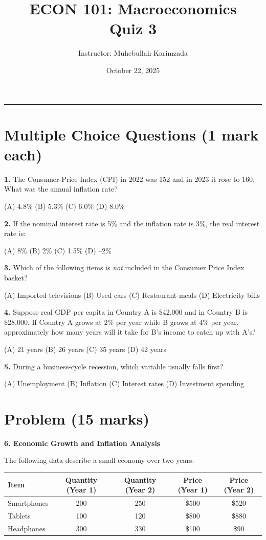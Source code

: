 \documentclass[12pt]{article}
\title{ECON 101: Macroeconomics \\ Quiz 3}
\author{Instructor: Muhebullah Karimzada}
\date{October 22,  2025}
\begin{document}
\maketitle
\hrule
\vspace{1em}

\section*{Multiple Choice Questions (1 mark each)}

\textbf{1.}  
The Consumer Price Index (CPI) in 2022 was 152 and in 2023 it rose to 160.  
What was the annual inflation rate?  

(A) 4.8\% \quad (B) 5.3\% \quad (C) 6.0\% \quad (D) 8.0\%


\textbf{2.}  
If the nominal interest rate is 5\% and the inflation rate is 3\%, the real interest rate is:  

(A) 8\% \quad (B) 2\% \quad (C) 1.5\% \quad (D) –2\%



\textbf{3.}  
Which of the following items is \emph{not} included in the Consumer Price Index basket?  

(A) Imported televisions \quad (B) Used cars \quad (C) Restaurant meals \quad (D) Electricity bills



\textbf{4.}  
Suppose real GDP per capita in Country A is \$42{,}000 and in Country B is \$28{,}000.  
If Country A grows at 2\% per year while B grows at 4\% per year, approximately how many years will it take for B’s income to catch up with A’s?  

(A) 21 years \quad (B) 26 years \quad (C) 35 years \quad (D) 42 years



\textbf{5.}  
During a business-cycle recession, which variable usually falls first?  

(A) Unemployment \quad (B) Inflation \quad (C) Interest rates \quad (D) Investment spending


\newpage
\section*{Problem (15 marks)}

\textbf{6. Economic Growth and Inflation Analysis}

The following data describe a small economy over two years:

\begin{center}
\begin{tabular}{lcccc}
\toprule
\textbf{Item} & \textbf{Quantity (Year 1)} & \textbf{Quantity (Year 2)} & \textbf{Price (Year 1)} & \textbf{Price (Year 2)} \\
\midrule
Smartphones & 200 & 250 & \$500 & \$520 \\
Tablets & 100 & 120 & \$800 & \$880 \\
Headphones & 300 & 330 & \$100 & \$90 \\
\bottomrule
\end{tabular}
\end{center}
\end{document}
